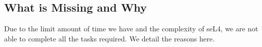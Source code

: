 \subsection{What is Missing and Why}
Due to the limit amount of time we have and the complexity of seL4,
we are not able to complete all the tasks required.
We detail the reasons here.
